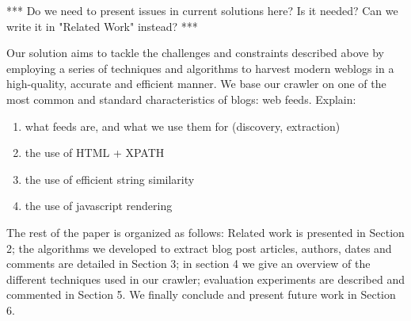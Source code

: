 *** Do we need to present issues in current solutions here? Is it needed? Can we write it in "Related Work" instead? ***

Our solution aims to tackle the challenges and constraints described above by employing a series of techniques and algorithms to harvest modern weblogs in a high-quality, accurate and efficient manner.
We base our crawler on one of the most common and standard characteristics of blogs: web feeds.
Explain:
\begin{enumerate}
  \item what feeds are, and what we use them for (discovery, extraction)
  \item the use of HTML + XPATH
  \item the use of efficient string similarity
  \item the use of javascript rendering
\end{enumerate}

The rest of the paper is organized as follows: Related work is presented in Section 2; the algorithms we developed to extract blog post articles, authors, dates and comments are detailed in Section 3; in section 4 we give an overview of the different techniques used in our crawler; evaluation experiments are described and commented in Section 5. We finally conclude and present future work in Section 6.





